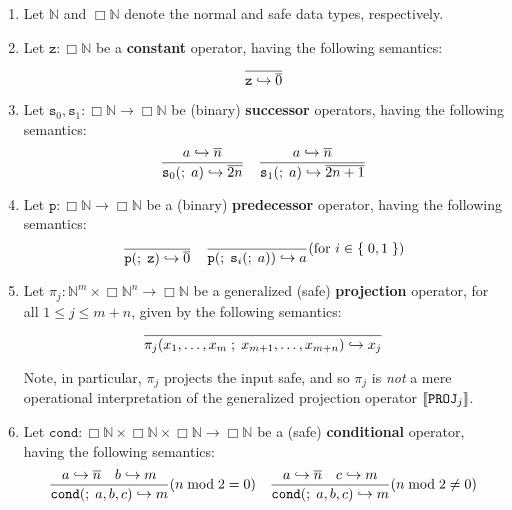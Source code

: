 \begin{definition} \cite{bellantoni-cook-1992}

\begin{enumerate}[label=(\arabic*)]

\item Let $\mathbb{N}$ and $\Box\mathbb{N}$ denote the normal and safe data
types, respectively.

\item Let $\mathtt{z} : \Box\mathbb{N}$ be a \textbf{constant} operator, having
the following semantics:$$
%
\axiom{ \mathtt{z} \goesto \repr{0} }
%
$$

\item Let $\mathtt{s}_0,\mathtt{s}_1 : \Box\mathbb{N} \rightarrow
\Box\mathbb{N}$ be (binary) \textbf{successor} operators, having the following
semantics:$$
%
\judgement{ a \goesto \repr{n} }{
%
  \mathtt{s}_0\p{\semic{} a} \goesto \repr{2n}
%
} \quad
%
\judgement{ a \goesto \repr{n} }{
%
  \mathtt{s}_1\p{\semic{} a} \goesto \repr{2n + 1}
%
}
%
$$

\item Let $\mathtt{p} : \Box\mathbb{N} \rightarrow \Box\mathbb{N}$ be a
(binary) \textbf{predecessor} operator, having the following semantics: $$
%
\axiom{
%
  \mathtt{p}\p{\semic{} \mathtt{z}} \goesto \repr{0}
%
}
%
\quad\axiom{
%
  \mathtt{p}\p{\semic{} \mathtt{s}_i\p{\semic{} a}} \goesto a
%
}\p{\text{for $i \in \set{0,1}$}}
%
$$

\item Let $\pi_j : \mathbb{N}^m \times \Box\mathbb{N}^n \rightarrow
\Box\mathbb{N}$ be a generalized (safe) \textbf{projection} operator, for all
$1 \leq j \leq m+n$, given by the following semantics:$$
%
\axiom{ \pi_j\p{x_1,\ldots,x_m \semic{} x_{m+1},\ldots,x_{m+n}} \goesto x_j }
%
$$

Note, in particular, $\pi_j$ projects the input safe, and so $\pi_j$ is
\emph{not} a mere operational interpretation of the generalized projection
operator ${\mathopen{}\left\llbracket{\mathtt{PROJ}_j}\right\rrbracket\mathclose{}}$.

\item Let $\mathtt{cond} : \Box\mathbb{N} \times \Box\mathbb{N} \times
\Box\mathbb{N} \rightarrow \Box\mathbb{N}$ be a (safe) \textbf{conditional}
operator, having the following semantics:$$
%
\judgement{
%
  a \goesto \repr{n} \quad b \goesto m
%
}{
%
  \mathtt{cond}\p{\semic{} a, b, c} \goesto m
%
}\p{n \bmod 2 = 0}
%
\quad\judgement{
%
  a \goesto \repr{n} \quad c \goesto m
%
}{
%
  \mathtt{cond}\p{\semic{} a, b, c} \goesto m
%
}\p{n \bmod 2 \neq 0}
%
$$


\end{enumerate}
\end{definition}
